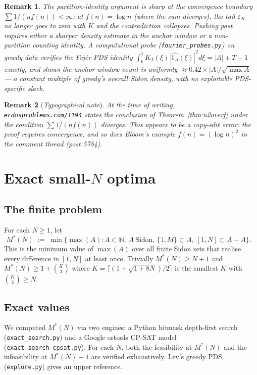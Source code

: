 \documentclass[11pt]{article}
\newtheorem*{remark}{Remark}
\begin{document}
\begin{remark}\label{rem:sharp}
The partition-identity argument is sharp at the convergence boundary
$\sum 1/(nf(n)) < \infty$: at $f(n) = \log n$ (where the sum diverges),
the tail $\varepsilon_K$ no longer goes to zero with $K$ and the
contradiction collapses. Pushing past requires either a sharper density
estimate in the anchor window or a non-partition counting identity.
A computational probe (\texttt{fourier\_probes.py}) on greedy data
verifies the Fej\'er PDS identity
$\int_0^1 K_T(\xi) |\widehat{1_A}(\xi)|^2 d\xi = |A| + T - 1$
exactly, and shows the anchor window count is uniformly
$\approx 0.42 \times |A|/\sqrt{\max A}$ --- a constant multiple of
greedy's overall Sidon density, with no exploitable PDS-specific slack.
\end{remark}

\begin{remark}[\emph{Typographical note}]
At the time of writing, \texttt{erdosproblems.com/1194} states the
conclusion of Theorem~\ref{thm:n2overf} under the condition
$\sum 1/(nf(n))$ \emph{diverges}. This appears to be a copy-edit error:
the proof requires convergence, and so does Bloom's example
$f(n) = (\log n)^2$ in the comment thread (post 5784).
\end{remark}

\section{Exact small-$N$ optima}\label{sec:finite}

\subsection{The finite problem}

For each $N \geq 1$, let
\[
   M^*(N) \;:=\; \min\bigl\{ \max(A) : A \subset \mathbb{N},\ A\ \text{Sidon},\
   \{1, M\} \subset A,\ [1, N] \subset A - A \bigr\}.
\]
This is the minimum value of $\max(A)$ over all finite Sidon sets that
realise every difference in $[1, N]$ at least once. Trivially
$M^*(N) \geq N + 1$ and $M^*(N) \geq 1 + \binom{K}{2}$ where
$K = \lceil (1+\sqrt{1+8N})/2 \rceil$ is the smallest $K$ with
$\binom{K}{2} \geq N$.

\subsection{Exact values}

We computed $M^*(N)$ via two engines: a Python bitmask depth-first
search (\texttt{exact\_search.py}) and a Google ortools CP-SAT model
(\texttt{exact\_search\_cpsat.py}). For each $N$, both the feasibility
at $M^*(N)$ and the infeasibility at $M^*(N) - 1$ are verified
exhaustively. Lev's greedy PDS (\texttt{explore.py}) gives an upper
reference.
\end{document}
